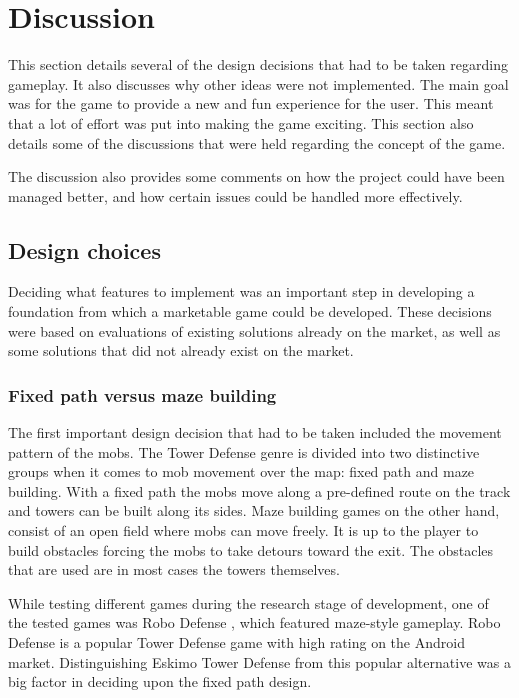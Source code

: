 \chapter{Discussion}

This section details several of the design decisions that had to be taken regarding gameplay. It also discusses why other ideas were not implemented. The main goal was for the game to provide a new and fun experience for the user. This meant that a lot of effort was put into making the game exciting. This section also details some of the discussions that were held regarding the concept of the game. 

The discussion also provides some comments on how the project could have been managed better, and how certain issues could be handled more effectively.
\section{Design choices}

Deciding what features to implement was an important step in developing a foundation from which a marketable game could be developed. These decisions were based on evaluations of existing solutions already on the market, as well as some solutions that did not already exist on the market.
\subsection{Fixed path versus maze building}

The first important design decision that had to be taken included the movement pattern of the mobs. The Tower Defense genre is divided into two distinctive groups when it comes to mob movement over the map: fixed path and maze building. With a fixed path the mobs move along a pre-defined route on the track and towers can be built along its sides. Maze building games on the other hand, consist of an open field where mobs can move freely. It is up to the player to build obstacles forcing the mobs to take detours toward the exit. The obstacles that are used are in most cases the towers themselves. 

While testing different games during the research stage of development, one of the tested games was Robo Defense \citep{lupidLabs}, which featured maze-style gameplay. Robo Defense is a popular Tower Defense game with high rating on the Android market. Distinguishing Eskimo Tower Defense from this popular alternative was a big factor in deciding upon the fixed path design.

